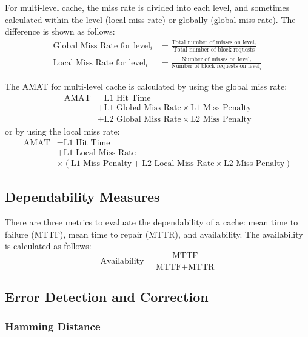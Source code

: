\documentclass[a4paper,12pt]{article}
\begin{document}
For multi-level cache, the miss rate is divided into each level, and sometimes calculated within the level (local miss rate) or globally (global miss rate). The difference is shown as follows:
\begin{align*}
	\text{Global Miss Rate for level}_i &= \frac{\text{Total number of misses on level}_i}{\text{Total number of block requests}} \\
	\text{Local Miss Rate for level}_i &= \frac{\text{Number of misses on level}_i}{\text{Number of block requests on level}_i}
\end{align*}

The AMAT for multi-level cache is calculated by using the global miss rate:
\begin{align*}
	\text{AMAT} &= \text{L1 Hit Time} \\
	&+ \text{L1 Global Miss Rate} \times \text{L1 Miss Penalty} \\
	&+ \text{L2 Global Miss Rate} \times \text{L2 Miss Penalty}
\end{align*}
or by using the local miss rate:
\begin{align*}
	\text{AMAT} &= \text{L1 Hit Time} \\
	&+ \text{L1 Local Miss Rate} \\
	&\times \left( \text{L1 Miss Penalty} + \text{L2 Local Miss Rate} \times \text{L2 Miss Penalty} \right)
\end{align*}

\subsection{Dependability Measures}

There are three metrics to evaluate the dependability of a cache: mean time to failure (MTTF), mean time to repair (MTTR), and availability. The availability is calculated as follows:
\begin{equation*}
	\text{Availability} = \frac{\text{MTTF}}{\text{MTTF} + \text{MTTR}}
\end{equation*}

\subsection{Error Detection and Correction}

\subsubsection{Hamming Distance}
\end{document}
